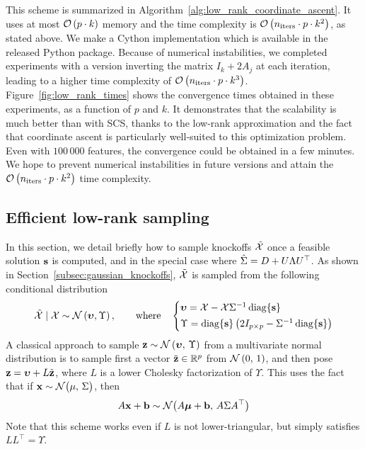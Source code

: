 This scheme is summarized in Algorithm~\ref{alg:low_rank_coordinate_ascent}.
It uses at most $\mathcal{O}\left( p \cdot k \right)$ memory
and the time complexity is $\mathcal{O}\left( n_\text{iters} \cdot p \cdot k^2 \right)$, as stated above.
We make a Cython implementation which is available in the released Python package.
Because of numerical instabilities, we completed experiments with a version inverting the matrix
$I_k + 2A_j$ at each iteration, leading to a higher time complexity of
$\mathcal{O}\left( n_\text{iters} \cdot p \cdot k^3 \right)$.
Figure~\ref{fig:low_rank_times} shows the convergence times obtained in these experiments,
as a function of $p$ and $k$.
It demonstrates that the scalability is much better than with SCS,
thanks to the low-rank approximation and the fact that coordinate ascent
is particularly well-suited to this optimization problem.
Even with $100\,000$ features, the convergence could be obtained in a few minutes.
We hope to prevent numerical instabilities in future versions and attain the
$\mathcal{O}\left( n_\text{iters} \cdot p \cdot k^2 \right)$ time complexity.

\subsection{Efficient low-rank sampling}\label{subsec:low_rank_sampling}

In this section, we detail briefly how to sample knockoffs $\tilde{\mathcal{X}}$ once
a feasible solution $\mathbf{s}$ is computed,
and in the special case where $\hat{\Sigma} = D + U\Lambda U^\top$.
As shown in Section~\ref{subsec:gaussian_knockoffs},
$\tilde{\mathcal{X}}$ is sampled from the following conditional distribution
\begin{equation}\label{eq:conditional_gaussian_knockoffs3}
    \tcX \mid \cX \sim \cN\left( \bupsilon, \Upsilon \right)
    ,\qquad\text{where}\quad
    \begin{cases*}
        \bupsilon = \cX - \cX\Sigma^{-1}\diag\{ \bs \}\\
        \Upsilon = \diag\{ \bs \}\left( 2I_{p \times p} - \Sigma^{-1}\diag\{ \bs \} \right)
    \end{cases*}
\end{equation}
A classical approach to sample
$\mathbf{z} \sim \mathcal{N}\left( \bm{\upsilon},\, \Upsilon \right)$
from a multivariate normal distribution is to sample first a vector
$\tilde{\mathbf{z}} \in \mathbb{R}^p$ from $\mathcal{N}\left( 0,\, 1 \right)$,
and then pose $\mathbf{z} = \bm{\upsilon} + L\tilde{\mathbf{z}}$,
where $L$ is a lower Cholesky factorization of $\Upsilon$.
This uses the fact that if $\mathbf{x} \sim \mathcal{N}\big( \mu,\, \Sigma \big)$,
then
\begin{equation}\label{eq:affine_transformation}
    A\mathbf{x} + \mathbf{b} \sim \mathcal{N}\big( A\bm{\mu} + \mathbf{b},\, A\Sigma A^\top \big)
\end{equation}
Note that this scheme works even if $L$ is not lower-triangular,
but simply satisfies $LL^\top = \Upsilon$.

